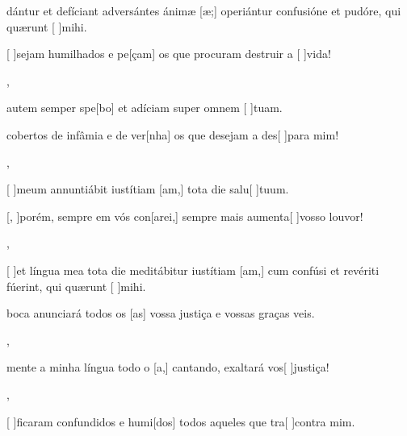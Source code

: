 {  {\item {}dántur et defíciant adversántes ánimæ [\-æ;] operiántur confusióne et pudóre, qui quærunt [ ]{mi}hi.~\Antiphona}%
    {\item {}[ ]{se}jam humilhados e pe[çam] os que procuram destruir a [ ]{vi}da!~\Antiphona},
  {\item {} autem semper spe[bo] et adíciam super omnem [ ]{tu}am.~\Antiphona}%
    {\item {} cobertos de infâmia e de ver[nha] os que desejam a des[ ]{pa}ra mim!~\Antiphona},
  {\item {}[ ]{me}um annuntiábit iustítiam [am,] tota die salu[ ]{tu}um.~\Antiphona}%
    {\item {}[, ]{po}rém, sempre em vós con[arei,] sempre mais aumenta[ ]{vos}{so} louvor!~\Antiphona},
  {\item {}[ ]{et} língua mea tota die meditábitur iustítiam [am,] cum confúsi et revériti fúerint, qui quærunt [ ]{mi}hi.~\Antiphona}%
    {\item {} boca anunciará todos os [as] vossa justiça e vossas graças veis.~\Antiphona},
  {~\Antiphona}%
    {\item {}mente a minha língua todo o [a,] cantando, exaltará vos[ ]{jus}{ti}ça!~\Antiphona},
  {~\Antiphona}%
    {\item {}[ ]{fi}caram confundidos e humi[dos] todos aqueles que tra[ ]{con}tra mim.~\Antiphona}
}